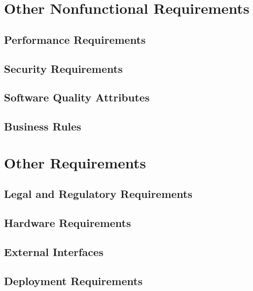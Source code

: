 \documentclass{scrreprt}
\begin{document}
\chapter{Other Nonfunctional Requirements}


\section{Performance Requirements}

\section{Security Requirements}

\section{Software Quality Attributes}


\section{Business Rules}


\chapter{Other Requirements}

\section{Legal and Regulatory Requirements}

\section{Hardware Requirements}

\section{External Interfaces}

\section{Deployment Requirements}
\end{document}
